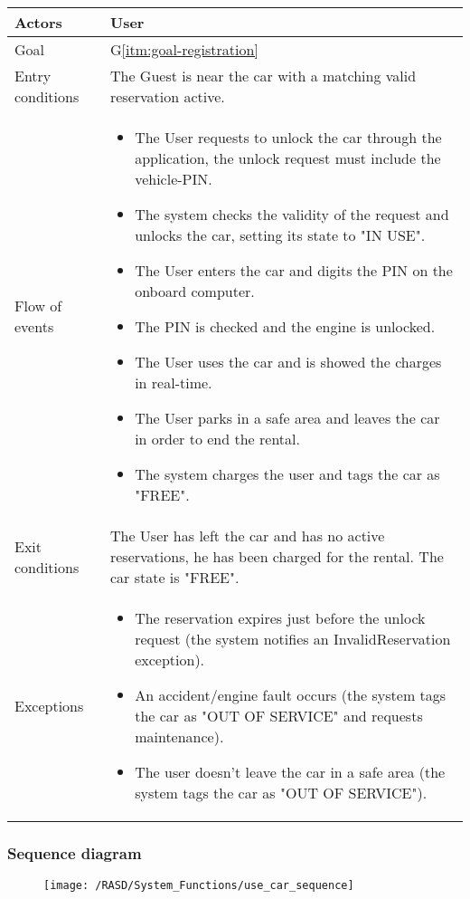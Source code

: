 \begin{center}
  \begin{tabular}{ l | p{10cm} }
    \hline
    Actors & User\\ \hline
    Goal & G\ref{itm:goal-registration}\\ \hline
    Entry conditions & The Guest is near the car with a matching valid reservation active. 
     \\ \hline
    Flow of events &
    \begin{itemize} %
      \item The User requests to unlock the car through the application, the unlock request must include the vehicle-PIN.
      \item The system checks the validity of the request and unlocks the car, setting its state to "IN USE".
      \item The User enters the car and digits the PIN on the onboard computer.
      \item The PIN is checked and the engine is unlocked.
      \item The User uses the car and is showed the charges in real-time.
      \item The User parks in a safe area and leaves the car in order to end the rental.
      \item The system charges the user and tags the car as "FREE".
    \end{itemize} \\ \hline
    Exit conditions & The User has left the car and has no active reservations, he has been charged for the rental. The car state is "FREE". \\ \hline
  	Exceptions & 
    \begin{itemize}
      \item The reservation expires just before the unlock request (the system notifies an InvalidReservation exception).
      \item An accident/engine fault occurs (the system tags the car as "OUT OF SERVICE" and requests maintenance).
      \item The user doesn't leave the car in a safe area (the system tags the car as "OUT OF SERVICE").
    \end{itemize} \\ \hline
  \end{tabular}
\end{center}

\newpage
\subsubsection{Sequence diagram}
\begin{figure}[!ht]
  \centering
  \vspace{0.2cm}
  \texttt{[image: /RASD/System\_Functions/use\_car\_sequence]}\\
  \vspace{0.4cm}
  \label{fig:use_car_sequence} 
\end{figure}

